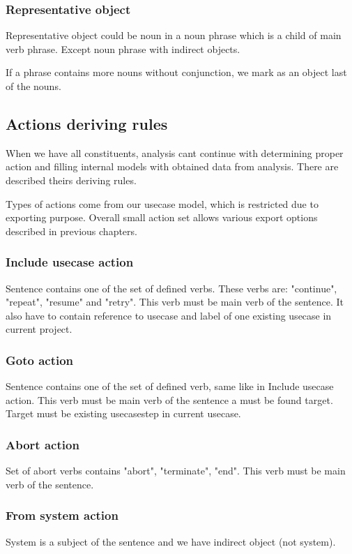 \subsubsection{Representative object}
Representative object could be noun in a noun phrase which is a child of main verb phrase. Except noun phrase with indirect objects.

If a phrase contains more nouns without conjunction, we mark as an object last of the nouns.

\subsection{Actions deriving rules}
When we have all constituents, analysis cant continue with determining proper action and filling internal models with obtained data from analysis. There are described theirs deriving rules. 

Types of actions come from our usecase model, which is restricted due to exporting purpose. Overall small action set allows various export options described in previous chapters. 

\subsubsection{Include usecase action}
Sentence contains one of the set of defined verbs. These verbs are: "continue", "repeat", "resume" and "retry".  This verb must be main verb of the sentence. It also have to contain reference to usecase and label of one existing usecase in current project.

\subsubsection{Goto action}
Sentence contains one of the set of defined verb, same like in Include usecase action. This verb must be main verb of the sentence a must be found target. Target must be existing usecasestep in current usecase. 

\subsubsection{Abort action}
Set of abort verbs contains "abort", "terminate", "end".  This verb must be main verb of the sentence.

\subsubsection{From system action}
System is a subject of the sentence and we have indirect object (not system).


